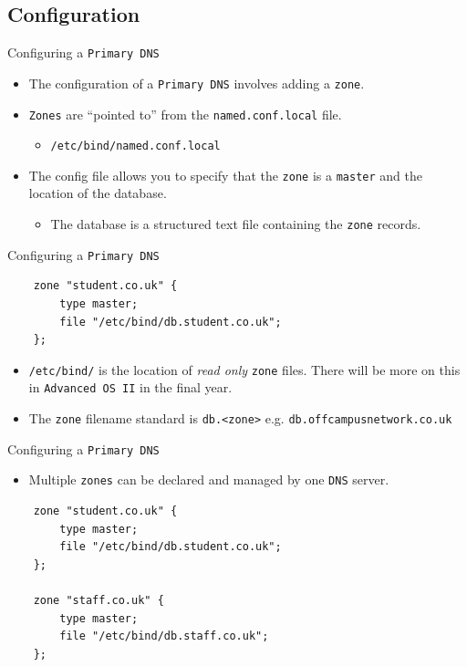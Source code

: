 \documentclass[aspectratio=169,xcolor=table]{beamer}
\begin{document}
\subsection{Configuration}
\begin{frame}{Configuring a \texttt{Primary DNS}}
  \begin{itemize}
    \item The configuration of a \texttt{Primary DNS} involves adding a \texttt{zone}.
    \item \texttt{Zones} are ``pointed to'' from the \texttt{named.conf.local} file.
      \begin{itemize}
        \item \texttt{/etc/bind/named.conf.local}
      \end{itemize}
    \item The config file allows you to specify that the \texttt{zone} is a \texttt{master} and the location of the database.
      \begin{itemize}
        \item The database is a structured text file containing the \texttt{zone} records.
      \end{itemize}
  \end{itemize}
\end{frame}

\begin{frame}[fragile]{Configuring a \texttt{Primary DNS}}
  \lstset{
    basicstyle=\small\ttfamily,
  }
  \begin{lstlisting}
    zone "student.co.uk" {
	    type master;
	    file "/etc/bind/db.student.co.uk";
    };
  \end{lstlisting}
  \begin{tcolorbox}[title={\textbf{NOTE:}}]
    \begin{itemize}
      \item \texttt{/etc/bind/} is the location of \textit{read only} \texttt{zone} files. There will be more on this in \texttt{Advanced OS II} in the final year.
      \item The \texttt{zone} filename standard is \texttt{db.<zone>} e.g. \texttt{db.offcampusnetwork.co.uk} 
    \end{itemize}
  \end{tcolorbox}
\end{frame}

\begin{frame}[fragile]{Configuring a \texttt{Primary DNS}}
  \begin{itemize}
    \item Multiple \texttt{zones} can be declared and managed by one \texttt{DNS} server. 
  \end{itemize}
\lstset{
    basicstyle=\small\ttfamily,
  }
  \begin{lstlisting}
    zone "student.co.uk" {
	    type master;
	    file "/etc/bind/db.student.co.uk";
    };

    zone "staff.co.uk" {
	    type master;
	    file "/etc/bind/db.staff.co.uk";
    };
  \end{lstlisting}
\end{frame}
\end{document}
